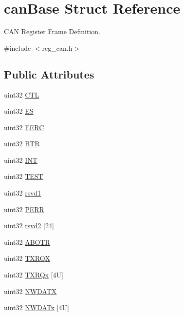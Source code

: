 \hypertarget{structcanBase}{}\section{can\+Base Struct Reference}
\label{structcanBase}


C\+AN Register Frame Definition.  




{\ttfamily \#include $<$reg\+\_\+can.\+h$>$}

\subsection*{Public Attributes}
\begin{DoxyCompactItemize}
\item 
uint32 \mbox{\hyperlink{structcanBase_aeb30029ea44e5a13ac1a922a37bb65e1}{C\+TL}}
\item 
uint32 \mbox{\hyperlink{structcanBase_a39c63e960bd532201260f14c5e3196cd}{ES}}
\item 
uint32 \mbox{\hyperlink{structcanBase_a55d7705d4d0ce64b48b8cc83fcb3b65e}{E\+E\+RC}}
\item 
uint32 \mbox{\hyperlink{structcanBase_adf351132631875785af2cb7cea4168d4}{B\+TR}}
\item 
uint32 \mbox{\hyperlink{structcanBase_ae12daf80850a231439fc9f6ce947db4b}{I\+NT}}
\item 
uint32 \mbox{\hyperlink{structcanBase_a4ac3103137aec39b89a353785f0f26af}{T\+E\+ST}}
\item 
uint32 \mbox{\hyperlink{structcanBase_ad88961784c847134b59e86e7ebdb7085}{rsvd1}}
\item 
uint32 \mbox{\hyperlink{structcanBase_aec0f3c119af71db3e1bd519fa03eb99b}{P\+E\+RR}}
\item 
uint32 \mbox{\hyperlink{structcanBase_af47f5ef7e741a1b2808d5eae2f49ef16}{rsvd2}} \mbox{[}24\mbox{]}
\item 
uint32 \mbox{\hyperlink{structcanBase_a76721a8260c3b52f2888f9f63a468130}{A\+B\+O\+TR}}
\item 
uint32 \mbox{\hyperlink{structcanBase_a698a4f1bfb7f04bb23aa4105d42d6f65}{T\+X\+R\+QX}}
\item 
uint32 \mbox{\hyperlink{structcanBase_aa8046a659a6d6d5a1d732f8a99a08e65}{T\+X\+R\+Qx}} \mbox{[}4\+U\mbox{]}
\item 
uint32 \mbox{\hyperlink{structcanBase_afdd6b5f24e865ce2535c9494b431238a}{N\+W\+D\+A\+TX}}
\item 
uint32 \mbox{\hyperlink{structcanBase_a53f26fe98410415daaf61a3277884635}{N\+W\+D\+A\+Tx}} \mbox{[}4\+U\mbox{]}

\end{DoxyCompactItemize}

